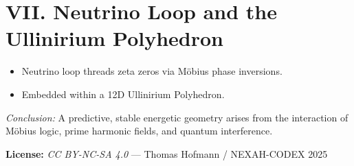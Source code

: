 \documentclass[12pt]{article}
\begin{document}
\section*{VII. Neutrino Loop and the Ullinirium Polyhedron}
\begin{itemize}
    \item Neutrino loop threads zeta zeros via Möbius phase inversions.
    \item Embedded within a 12D Ullinirium Polyhedron.
\end{itemize}

\noindent
\textit{Conclusion:} A predictive, stable energetic geometry arises from the interaction of Möbius logic, prime harmonic fields, and quantum interference.

\bigskip
\noindent
\textbf{License:} \textit{CC BY-NC-SA 4.0} — Thomas Hofmann / NEXAH-CODEX 2025
\end{document}
